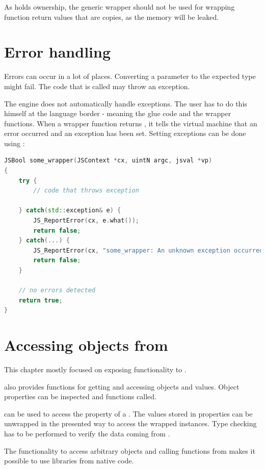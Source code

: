 As  holds ownership, the generic wrapper should not be used for wrapping function return values that are copies, as the memory will be leaked.

\section{Error handling}
\label{sec:ErrorHandling}

Errors can occur in a lot of places. Converting a parameter to the expected type might fail. The  code that is called may throw an exception.

The  engine does not automatically handle exceptions. The  user has to do this himself at the language border - meaning the glue code and the wrapper functions. When a wrapper function returns , it tells the virtual machine that an error occurred and an exception has been set. Setting exceptions can be done using :

\SingleSpacing
\begin{lstlisting}[language=C++, caption=Error handling at the language border]
JSBool some_wrapper(JSContext *cx, uintN argc, jsval *vp)
{
	try {
		// code that throws exception
		
	} catch(std::exception& e) {
		JS_ReportError(cx, e.what());
		return false;
	} catch(...) {
		JS_ReportError(cx, "some_wrapper: An unknown exception occurred");
		return false;
	}
	
	// no errors detected
	return true;
}
\end{lstlisting}
\OnehalfSpacing

\section{Accessing  objects from }

This chapter mostly focused on exposing  functionality to .

 also provides functions for getting and accessing  objects and values. Object properties can be inspected and functions called.

 can be used to access the property of a . The values stored in properties can be unwrapped in the presented way to access the wrapped  instances. Type checking has to be performed to verify the data coming from .

The functionality to access arbitrary  objects and calling  functions from  makes it possible to use  libraries from native code.